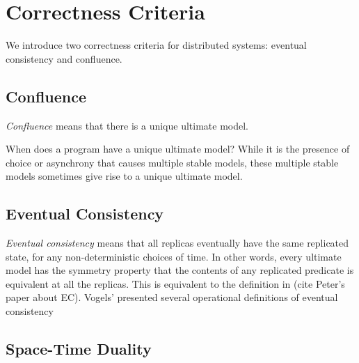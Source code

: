 \section{Correctness Criteria}

We introduce two correctness criteria for distributed systems: eventual consistency and confluence.

\subsection{Confluence}

{\em Confluence} means that there is a unique ultimate model.

When does a \lang program have a unique ultimate model?  While it is the presence of choice or asynchrony that causes multiple stable models, these multiple stable models sometimes give rise to a unique ultimate model.

\subsection{Eventual Consistency}

{\em Eventual consistency} means that all replicas eventually have the same replicated state, for any non-deterministic choices of time.  In other words, every ultimate model has the symmetry property that the contents of any replicated predicate is equivalent at all the replicas.  This is equivalent to the definition in (cite Peter's paper about EC).  Vogels' presented several operational definitions of eventual consistency 

\subsection{Space-Time Duality}




